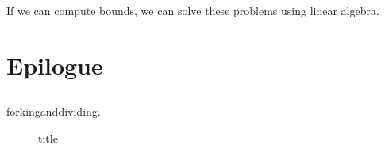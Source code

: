 \begin{remark}
	If we can compute bounds, we can solve these problems using linear algebra.
\end{remark}

\chapter{Epilogue}

\section{}

\href{www.forkinganddividing.com}{forkinganddividing}.

\begin{figure}[H]
	\centering
	\caption{title}
	\label{fig:random-graph-QE}
\end{figure}